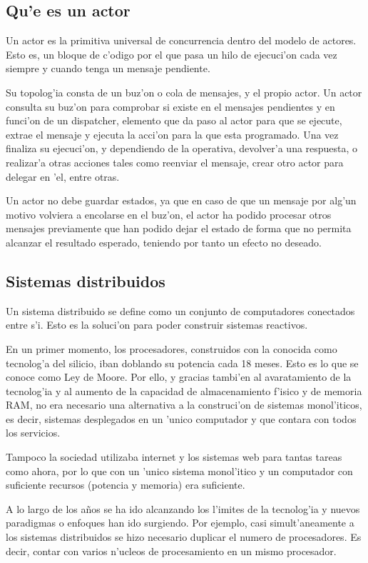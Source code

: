 \documentclass[12pt]{article}
\begin{document}
\subsection{Qu'e es un actor}
\label{sub:que es un actor}
Un actor es la primitiva universal de concurrencia dentro del modelo de actores. Esto es,
un bloque de c'odigo por el que pasa un hilo de ejecuci'on cada vez siempre y cuando
tenga un mensaje pendiente.

Su topolog'ia consta de un buz'on o cola de mensajes, y el propio actor. Un actor consulta su
buz'on para comprobar si existe en el mensajes pendientes y en funci'on de un dispatcher, elemento
que da paso al actor para que se ejecute, extrae el mensaje y ejecuta la acci'on para la que
esta programado. Una vez finaliza su ejecuci'on, y dependiendo de la operativa, devolver'a una
respuesta, o realizar'a otras acciones tales como reenviar el mensaje, crear otro actor
para delegar en 'el, entre otras.

Un actor no debe guardar estados, ya que en caso de que un mensaje por alg'un motivo
volviera a encolarse en el buz'on, el actor ha podido procesar otros mensajes previamente
que han podido dejar el estado de forma que no permita alcanzar el resultado esperado, teniendo
por tanto un efecto no deseado.

\subsection{Sistemas distribuidos}
\label{sub:sistemas distribuidos}
Un sistema distribuido se define como un conjunto de computadores conectados entre s'i. Esto
es la soluci'on para poder construir sistemas reactivos.

En un primer momento, los procesadores, construidos con la conocida como tecnolog'a del
silicio, iban doblando su potencia cada 18 meses. Esto es lo que se conoce como Ley de Moore.
Por ello, y gracias tambi'en al avaratamiento de la tecnolog'ia y al aumento de la capacidad de
almacenamiento f'isico y de memoria RAM, no era necesario una alternativa a la construci'on de sistemas
monol'iticos, es decir, sistemas desplegados en un 'unico computador y que contara con
todos los servicios.

Tampoco la sociedad utilizaba internet y los sistemas web para tantas tareas como ahora, por lo
que con un 'unico sistema monol'itico y un computador con suficiente recursos (potencia y memoria)
era suficiente.

A lo largo de los años se ha ido alcanzando los l'imites de la tecnolog'ia y nuevos paradigmas o
enfoques han ido surgiendo. Por ejemplo, casi simult'aneamente a los sistemas distribuidos se
hizo necesario duplicar el numero de procesadores. Es decir, contar con varios n'ucleos de
procesamiento en un mismo procesador.
\end{document}
